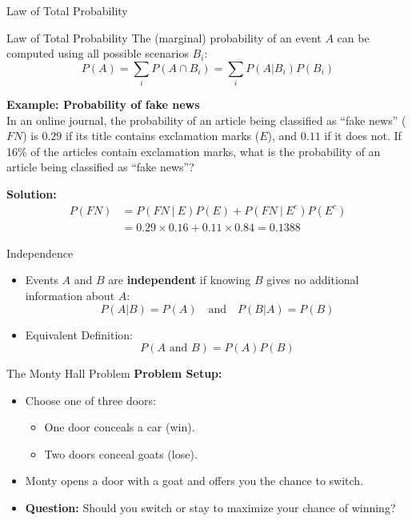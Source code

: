 \documentclass[aspectratio=169]{beamer}
\begin{document}
\begin{frame}{Law of Total Probability}
    \begin{coolblock}{Law of Total Probability}
    The (marginal) probability of an event \(A\) can be computed using all possible scenarios \(B_i\):
    \[
    P(A) = \sum_{i} P(A \cap B_i) = \sum_{i} P(A | B_i)P(B_i)
    \]
    \end{coolblock}
    \vspace{0.3cm}
    
    \textbf{Example: Probability of fake news} \\
    In an online journal, the probability of an article being classified as ``fake news'' ($FN$) is $0.29$ if its title contains exclamation marks ($E$), and $0.11$ if it does not. If 16\% of the articles contain exclamation marks, what is the probability of an article being classified as ``fake news''?
    \vspace{0.2cm}
    
    \textbf{Solution:} 
    \vspace{-0.4cm}
    \begin{align*}
        P(FN) &= P(FN\ |\ E)P(E) + P(FN\ |\ E^c)P(E^c) \\
        &= 0.29\times0.16 + 0.11\times0.84 = 0.1388    
    \end{align*}
    
\end{frame}

\begin{frame}{Independence}
    \begin{itemize}
        \item Events \(A\) and \(B\) are \textbf{independent} if knowing \(B\) gives no additional information about \(A\):
        \[
        P(A | B) = P(A) \quad \text{and} \quad P(B | A) = P(B)
        \]
        \item Equivalent Definition:
        \[
        P(A \text{ and } B) = P(A)P(B)
        \]
    \end{itemize}

\end{frame}

\begin{frame}{The Monty Hall Problem}
    \textbf{Problem Setup:}
    \begin{itemize}
        \item Choose one of three doors:
            \begin{itemize}
                \item[$\bullet$] One door conceals a car (win).
                \item[$\bullet$] Two doors conceal goats (lose).
            \end{itemize}
        \item Monty opens a door with a goat and offers you the chance to switch.
        \item \textbf{Question:} Should you switch or stay to maximize your chance of winning?
    \end{itemize}
\end{frame}
\end{document}

